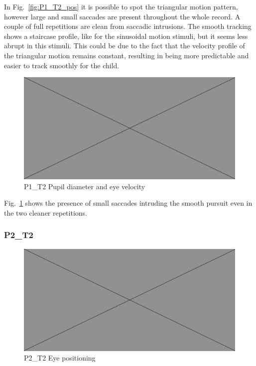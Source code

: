 In Fig.~\ref{fig:P1_T2_pos} it is possible to spot the triangular motion pattern, however large and small saccades are present throughout the whole record. A couple of full repetitions are clean from saccadic intrusions. The smooth tracking shows a staircase profile, like for the sinusoidal motion stimuli, but it seems less abrupt in this stimuli. This could be due to the fact that the velocity profile of the triangular motion remains constant, resulting in being more predictable and easier to track smoothly for the child.

\begin{figure}[h]
  \centering
  \includegraphics[width=.5\textwidth]{figures/placeholderImg.jpg}
  \caption[P1\_T2 pupil velocity]{P1\_T2 Pupil diameter and eye velocity}
  \label{fig:P1_T2_vel}
\end{figure}

Fig.~\ref{fig:P1_T2_vel} shows the presence of small saccades intruding the smooth pursuit even in the two cleaner repetitions.


\subsubsection{P2\_T2}
\label{sec:P2_T2}

\begin{figure}[h]
  \centering
  \includegraphics[width=.5\textwidth]{figures/placeholderImg.jpg}
  \caption[P1\_T2 Eye positioning]{P2\_T2 Eye positioning}
  \label{fig:P2_T2_pos}
\end{figure}


